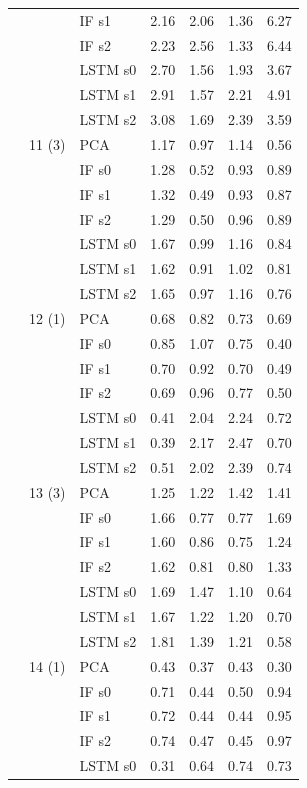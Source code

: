 \begin{scriptsize}
\begin{longtable}{lllrrrr}
 &  & IF s1 & 2.16 & 2.06 & 1.36 & 6.27 \\
 &  & IF s2 & 2.23 & 2.56 & 1.33 & 6.44 \\
 &  & LSTM s0 & 2.70 & 1.56 & 1.93 & 3.67 \\
 &  & LSTM s1 & 2.91 & 1.57 & 2.21 & 4.91 \\
 &  & LSTM s2 & 3.08 & 1.69 & 2.39 & 3.59 \\
 & 11 (3) & PCA & 1.17 & 0.97 & 1.14 & 0.56 \\
 &  & IF s0 & 1.28 & 0.52 & 0.93 & 0.89 \\
 &  & IF s1 & 1.32 & 0.49 & 0.93 & 0.87 \\
 &  & IF s2 & 1.29 & 0.50 & 0.96 & 0.89 \\
 &  & LSTM s0 & 1.67 & 0.99 & 1.16 & 0.84 \\
 &  & LSTM s1 & 1.62 & 0.91 & 1.02 & 0.81 \\
 &  & LSTM s2 & 1.65 & 0.97 & 1.16 & 0.76 \\
 & 12 (1) & PCA & 0.68 & 0.82 & 0.73 & 0.69 \\
 &  & IF s0 & 0.85 & 1.07 & 0.75 & 0.40 \\
 &  & IF s1 & 0.70 & 0.92 & 0.70 & 0.49 \\
 &  & IF s2 & 0.69 & 0.96 & 0.77 & 0.50 \\
 &  & LSTM s0 & 0.41 & 2.04 & 2.24 & 0.72 \\
 &  & LSTM s1 & 0.39 & 2.17 & 2.47 & 0.70 \\
 &  & LSTM s2 & 0.51 & 2.02 & 2.39 & 0.74 \\
 & 13 (3) & PCA & 1.25 & 1.22 & 1.42 & 1.41 \\
 &  & IF s0 & 1.66 & 0.77 & 0.77 & 1.69 \\
 &  & IF s1 & 1.60 & 0.86 & 0.75 & 1.24 \\
 &  & IF s2 & 1.62 & 0.81 & 0.80 & 1.33 \\
 &  & LSTM s0 & 1.69 & 1.47 & 1.10 & 0.64 \\
 &  & LSTM s1 & 1.67 & 1.22 & 1.20 & 0.70 \\
 &  & LSTM s2 & 1.81 & 1.39 & 1.21 & 0.58 \\
 & 14 (1) & PCA & 0.43 & 0.37 & 0.43 & 0.30 \\
 &  & IF s0 & 0.71 & 0.44 & 0.50 & 0.94 \\
 &  & IF s1 & 0.72 & 0.44 & 0.44 & 0.95 \\
 &  & IF s2 & 0.74 & 0.47 & 0.45 & 0.97 \\
 &  & LSTM s0 & 0.31 & 0.64 & 0.74 & 0.73 \\

\end{longtable}
\end{scriptsize}

